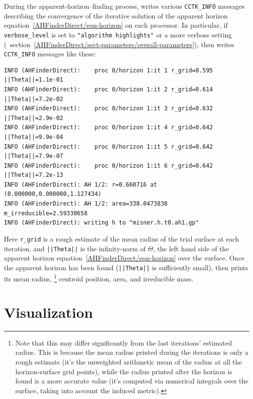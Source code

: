 During the apparent-horizon--finding process, 
writes various \verb|CCTK_INFO| messages describing the convergence
of the iterative solution of the apparent horizon
equation~\ref{AHFinderDirect/eqn-horizon} on each processor.
In particular, if \verb|verbose_level| is set to
\verb|"algorithm highlights"| or a more verbose setting
(\cf{}~section~\ref{AHFinderDirect/sect-parameters/overall-parameters}),
then  writes \verb|CCTK_INFO| messages like
these:
\begin{verbatim}
INFO (AHFinderDirect):    proc 0/horizon 1:it 1 r_grid=0.595 ||Theta||=1.1e-01
INFO (AHFinderDirect):    proc 0/horizon 1:it 2 r_grid=0.614 ||Theta||=7.2e-02
INFO (AHFinderDirect):    proc 0/horizon 1:it 3 r_grid=0.632 ||Theta||=2.9e-02
INFO (AHFinderDirect):    proc 0/horizon 1:it 4 r_grid=0.642 ||Theta||=9.9e-04
INFO (AHFinderDirect):    proc 0/horizon 1:it 5 r_grid=0.642 ||Theta||=7.9e-07
INFO (AHFinderDirect):    proc 0/horizon 1:it 6 r_grid=0.642 ||Theta||=7.2e-13
INFO (AHFinderDirect): AH 1/2: r=0.660716 at (0.000000,0.000000,1.127434)
INFO (AHFinderDirect): AH 1/2: area=338.0473838 m_irreducible=2.59330658
INFO (AHFinderDirect): writing h to "misner.h.t0.ah1.gp"
\end{verbatim}
Here \verb|r_grid| is a rough estimate of the mean radius of
the trial surface at each iteration, and \verb:||Theta||: is the
infinity-norm of $\Theta$, the left hand side of the apparent
horizon equation~\ref{AHFinderDirect/eqn-horizon} over the surface.
Once the apparent horizon has been found
(\verb:||Theta||: is sufficiently small), then 
prints its mean radius,%
\footnote{%
	 Note that this may differ significantly from
	 the last iterations' estimated radius.  This
	 is because the mean radius printed during the
	 iterations is only a rough estimate (it's the
	 unweighted arithmetic mean of the radius at
	 all the horizon-surface grid points), while
	 the radius printed after the horizon is found
	 is a more accurate value (it's computed via
	 numerical integrals over the surface, taking
	 into account the induced metric).
	 }%
{} centroid position, area, and irreducible mass.


\section{Visualization}
\label{AHFinderDirect/sect-visualization}

